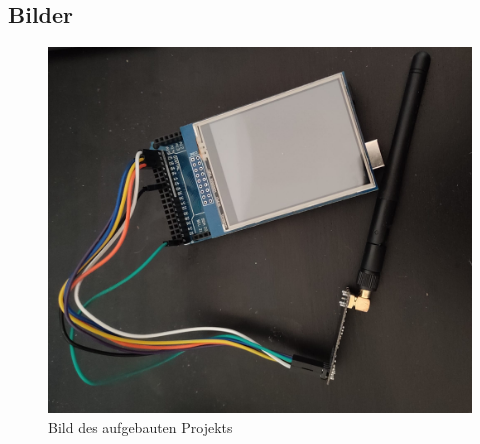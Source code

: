 \documentclass[a4paper, 11pt]{scrartcl}
\begin{document}
\begin{small}
\subsection{Bilder}\label{ch:pics}
\begin{figure}[H]
    \begin{center}
        \includegraphics[scale=0.15]{Bilder/projekt_fertig.jpeg}
        \caption{Bild des aufgebauten Projekts}\label{pic:project_done}
    \end{center}
\end{figure}


\end{small}
\end{document}
